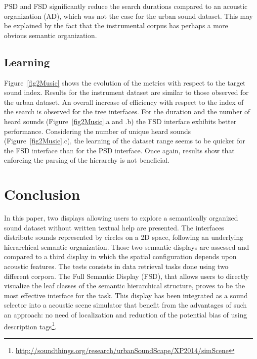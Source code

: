 \documentclass{aes2e}
\newcommand{\nm}[1]{\textcolor{magenta}{nm: #1}}
\begin{document}
PSD and FSD significantly reduce the search durations compared to an acoustic organization (AD), which was not the case for the urban sound dataset. This may be explained by the fact that the instrumental corpus has perhaps a more obvious semantic organization.

\subsection{Learning}

Figure~\ref{fig2Music} shows the evolution of the metrics with respect to the target sound index. Results for the instrument dataset are similar to those observed for the urban dataset. An overall increase of efficiency with respect to the index of the search is observed for the tree interfaces. For the duration and the number of heard sounds (Figure~\ref{fig2Music}.a and .b) the FSD interface exhibits better performance. Considering the number of unique heard sounds (Figure~\ref{fig2Music}.c), the learning of the dataset range seems to be quicker for the FSD interface than for the PSD interface. Once again, results show that enforcing the parsing of the hierarchy is not beneficial.

\section{Conclusion}


In this paper, two displays allowing users to explore a semantically organized sound dataset without written textual help are presented. The interfaces distribute sounds represented by circles on a 2D space, following an underlying hierarchical semantic organization. Those two semantic displays are assessed and compared to a third display in which the spatial configuration depends upon acoustic features. The tests consists in data retrieval tasks done using two different corpora. 
The Full Semantic Display (FSD), that allows users to directly visualize the leaf classes of the semantic hierarchical structure, proves to be the most effective interface for the task. This display has been integrated as a sound selector into a acoustic scene simulator that benefit from the advantages of such an approach: no need of localization and reduction of the potential bias of using description tags\footnote{\url{http://soundthings.org/research/urbanSoundScape/XP2014/simScene}}. 
\end{document}
